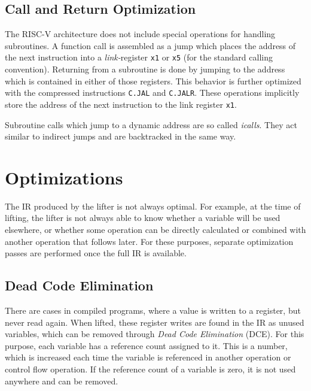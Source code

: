 \documentclass[course=eragp]{aspdoc}
\begin{document}
\subsection{Call and Return Optimization}
The RISC-V architecture does not include special operations for handling subroutines. A function call
is assembled as a jump which places the address of the next instruction into a \emph{link-}register
\texttt{x1} or \texttt{x5} (for the standard calling convention).\cite{rvspec} Returning from a
subroutine is done by jumping to the address which is contained in either of those registers. This
behavior is further optimized with the compressed instructions \texttt{C.JAL} and
\texttt{C.JALR}. These operations implicitly store the address of the next instruction
to the link register \texttt{x1}.\cite{rvspec}

\par

Subroutine calls which jump to a dynamic address are so called \emph{icalls}. They act
similar to indirect jumps and are backtracked in the same way.

\section{Optimizations}\label{sec:optimizations}

The IR produced by the lifter is not always optimal. For example, at the time of lifting, the lifter is not always able
to know whether a variable will be used elsewhere, or whether some operation can be directly calculated or combined with
another operation that follows later. For these purposes, separate optimization passes are performed once the full IR is
available.

\subsection{Dead Code Elimination}\label{dead_code_elimination}

There are cases in compiled programs, where a value is written to a register, but never read again.
When lifted, these register writes are found in the IR as unused variables, which can be removed through \emph{Dead Code
    Elimination} (DCE). For this purpose, each variable has a reference count assigned to it. This is a number, which is
increased each time the variable is referenced in another operation or control flow operation. If the reference count of
a variable is zero, it is not used anywhere and can be removed.
\end{document}
